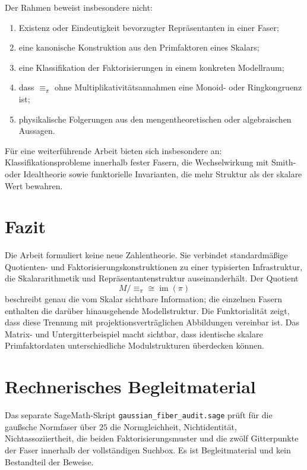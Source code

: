 \documentclass[11pt,a4paper,reqno]{amsart}
\theoremstyle{definition}
\theoremstyle{remark}
\newcommand{\im}{\operatorname{im}}
\begin{document}
Der Rahmen beweist insbesondere nicht:
\begin{enumerate}[label=\textup{(\arabic*)}]
  \item Existenz oder Eindeutigkeit bevorzugter Repräsentanten in einer Faser;
  \item eine kanonische Konstruktion aus den Primfaktoren eines Skalars;
  \item eine Klassifikation der Faktorisierungen in einem konkreten Modellraum;
  \item dass $\equiv_\pi$ ohne Multiplikativitätsannahmen eine Monoid- oder Ringkongruenz ist;
  \item physikalische Folgerungen aus den mengentheoretischen oder algebraischen Aussagen.
\end{enumerate}

Für eine weiterführende Arbeit bieten sich insbesondere an: Klassifikationsprobleme innerhalb fester Fasern, die Wechselwirkung mit Smith- oder Idealtheorie sowie funktorielle Invarianten, die mehr Struktur als der skalare Wert bewahren.

\section{Fazit}

Die Arbeit formuliert keine neue Zahlentheorie. Sie verbindet standardmäßige Quotienten- und Faktorisierungskonstruktionen zu einer typisierten Infrastruktur, die Skalararithmetik und Repräsentantenstruktur auseinanderhält. Der Quotient
\[
  M/{\equiv_\pi}\cong\im(\pi)
\]
beschreibt genau die vom Skalar sichtbare Information; die einzelnen Fasern enthalten die darüber hinausgehende Modellstruktur. Die Funktorialität zeigt, dass diese Trennung mit projektionsverträglichen Abbildungen vereinbar ist. Das Matrix- und Untergitterbeispiel macht sichtbar, dass identische skalare Primfaktordaten unterschiedliche Modulstrukturen überdecken können.

\section*{Rechnerisches Begleitmaterial}

Das separate SageMath-Skript \texttt{gaussian\_fiber\_audit.sage} prüft für die gaußsche Normfaser über $25$ die Normgleichheit, Nichtidentität, Nichtassoziiertheit, die beiden Faktorisierungsmuster und die zwölf Gitterpunkte der Faser innerhalb der vollständigen Suchbox. Es ist Begleitmaterial und kein Bestandteil der Beweise.
\end{document}
